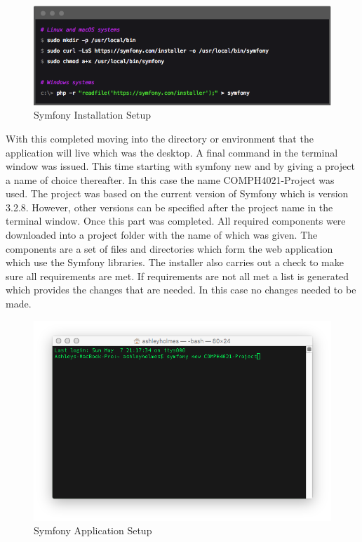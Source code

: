 \begin{figure}[htbp]
   \centering
   \includegraphics[width=400pt]{figures/symfony_installation.png} %
   \caption{Symfony Installation Setup}
   \label{fig:Symfony Installation Setup}
\end{figure}

With this completed moving into the directory or environment that the application will live which was the desktop. A final command in the terminal window was issued. This time starting with symfony new and by giving a project a name of choice thereafter. In this case the name COMPH4021-Project was used. The project was based on the current version of Symfony which is version 3.2.8. However, other versions can be specified after the project name in the terminal window. Once this part was completed. All required components were downloaded into a project folder with the name of which was given. The components are a set of files and directories which form the web application which use the Symfony libraries. The installer also carries out a check to make sure all requirements are met. If requirements are not all met a list is generated which provides the changes that are needed. In this case no changes needed to be made.

\begin{figure}[htbp]
   \centering
   \includegraphics[width=400pt]{figures/new_application.png} %
   \caption{Symfony Application Setup}
   \label{fig:Symfony Application Setup}
\end{figure}

